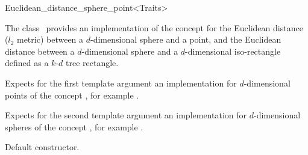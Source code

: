 

\begin{ccRefClass}{Euclidean_distance_sphere_point<Traits>}  %


\ccDefinition
  
The class \ccRefName\ provides an implementation of the
 concept for the Euclidean distance ($l_2$
metric) between a $d$-dimensional sphere and a point, and the
Euclidean distance between a $d$-dimensional sphere and a
$d$-dimensional iso-rectangle defined as a $k$-$d$ tree rectangle.



\ccParameters
Expects for the first template argument an implementation for
$d$-dimensional points of the concept , for example
.

Expects for the second template argument an implementation 
for $d$-dimensional spheres of the concept ,
for example .


\ccIsModel


\ccTypes



\ccCreation
{}  %


{Default constructor.}

\ccOperations



\end{ccRefClass}
